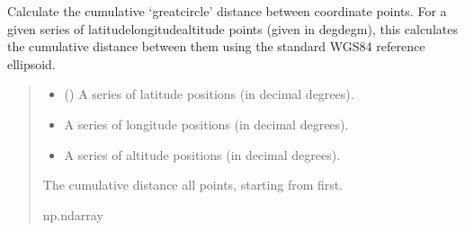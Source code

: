 \documentclass[letterpaper,10pt,english]{sphinxmanual}
\begin{document}

\begin{fulllineitems}
\label{\detokenize{modules/waypoints/trajectory:qnav.waypoints.trajectory.cumulative_distance}}
\pysigstartsignatures
{}
\pysigstopsignatures
\sphinxAtStartPar
Calculate the cumulative ‘great\sphinxhyphen{}circle’ distance between coordinate points.
For a given series of latitude\sphinxhyphen{}longitude\sphinxhyphen{}altitude points (given in
deg\sphinxhyphen{}deg\sphinxhyphen{}m), this calculates the cumulative distance between them using
the standard WGS\sphinxhyphen{}84 reference ellipsoid.
\begin{quote}\begin{description}
\begin{itemize}
\item {} 
\sphinxAtStartPar
{} (\sphinxstyleliteralemphasis{\sphinxupquote{ (}}\sphinxstyleliteralemphasis{\sphinxupquote{)}}) \textendash{} A series of latitude positions (in decimal degrees).

\item {} 
\sphinxAtStartPar
{} \textendash{} A series of longitude positions (in decimal degrees).

\item {} 
\sphinxAtStartPar
{} \textendash{} A series of altitude positions (in decimal degrees).

\end{itemize}

\sphinxAtStartPar
The cumulative distance all points, starting from first.

\sphinxAtStartPar
np.ndarray

\end{description}\end{quote}

\end{fulllineitems}
\end{document}
